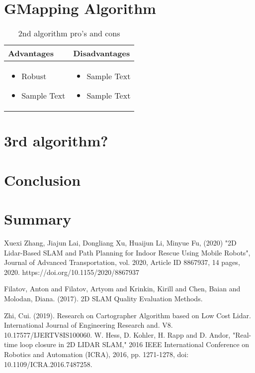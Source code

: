 \documentclass[12pt, a4paper, onecolumn]{article}
\begin{document}
\section{GMapping Algorithm}
\begin{table}[h!]
\centering
\begin{tabular}{ |p{6cm}||p{6cm}|  }
 \hline
 Advantages&Disadvantages\\
 \hline
\begin{itemize}
  \item Robust
  \item Sample Text
  \end{itemize} 
  & 
  \begin{itemize}
  \item Sample Text
  \item Sample Text
  \end{itemize} \\

 \hline
\end{tabular}
\caption{2nd algorithm pro's and cons}
\label{table:2}
\end{table}

\section{3rd algorithm?}

\section{Conclusion}

\section{Summary}
\newpage
\begin{thebibliography}{9}
Xuexi Zhang, Jiajun Lai, Dongliang Xu, Huaijun Li, Minyue Fu, (2020) "2D Lidar-Based SLAM and Path Planning for Indoor Rescue Using Mobile Robots", Journal of Advanced Transportation, vol. 2020, Article ID 8867937, 14 pages, 2020. https://doi.org/10.1155/2020/8867937

Filatov, Anton and Filatov, Artyom and Krinkin, Kirill and Chen, Baian and Molodan, Diana. (2017). 2D SLAM Quality Evaluation Methods. 

Zhi, Cui. (2019). Research on Cartographer Algorithm based on Low Cost Lidar. International Journal of Engineering Research and. V8. 10.17577/IJERTV8IS100060. 
W. Hess, D. Kohler, H. Rapp and D. Andor, "Real-time loop closure in 2D LIDAR SLAM," 2016 IEEE International Conference on Robotics and Automation (ICRA), 2016, pp. 1271-1278, doi: 10.1109/ICRA.2016.7487258.
\end{thebibliography}
\end{document}
